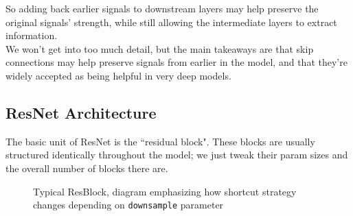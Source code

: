 \documentclass{article}
\newcommand{\ttt}[1]{\texttt{#1}}
\begin{document}
So adding back earlier signals to downstream layers may help preserve the original signals' strength, while still allowing the intermediate layers to extract information. \\


We won't get into too much detail, but the main takeaways are that skip connections may help preserve signals from earlier in the model, and that they're widely accepted as being helpful in very deep models.


\subsection{ResNet Architecture}

The basic unit of ResNet is the ``residual block". These blocks are usually structured identically throughout the model; we just tweak their param sizes and the overall number of blocks there are.  

\begin{figure}[h]
    \centering
    \caption{Typical ResBlock, diagram emphasizing how shortcut strategy changes depending on \ttt{downsample} parameter}
\end{figure}
\end{document}
